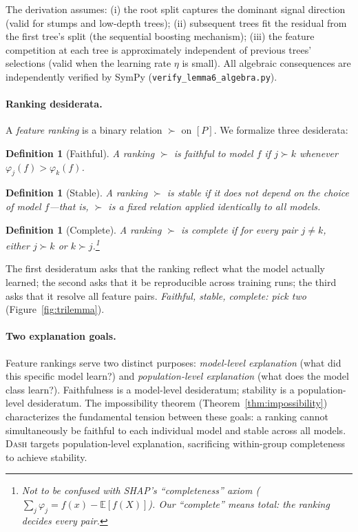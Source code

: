 \documentclass{article}
\newtheorem{definition}[theorem]{Definition}
\newcommand{\E}{\mathbb{E}}
\newcommand{\DASH}{\textsc{Dash}}
\begin{document}
The derivation assumes: (i) the root split captures the dominant signal direction (valid for stumps and low-depth trees); (ii) subsequent trees fit the residual from the first tree's split (the sequential boosting mechanism); (iii) the feature competition at each tree is approximately independent of previous trees' selections (valid when the learning rate $\eta$ is small). All algebraic consequences are independently verified by SymPy (\texttt{verify\_lemma6\_algebra.py}).

\paragraph{Ranking desiderata.}
A \emph{feature ranking} is a binary relation $\succ$ on $[P]$.
We formalize three desiderata:

\begin{definition}[Faithful]
\label{def:faithful}
A ranking $\succ$ is \emph{faithful} to model $f$ if $j \succ k$ whenever $\varphi_j(f) > \varphi_k(f)$.
\end{definition}

\begin{definition}[Stable]
\label{def:stable}
A ranking $\succ$ is \emph{stable} if it does not depend on the choice of model $f$---that is, $\succ$ is a fixed relation applied identically to all models.
\end{definition}

\begin{definition}[Complete]
\label{def:complete}
A ranking $\succ$ is \emph{complete} if for every pair $j \neq k$, either $j \succ k$ or $k \succ j$.\footnote{Not to be confused with SHAP's ``completeness'' axiom ($\sum_j \varphi_j = f(x) - \E[f(X)]$). Our ``complete'' means \emph{total}: the ranking decides every pair.}
\end{definition}

The first desideratum asks that the ranking reflect what the model actually learned; the second asks that it be reproducible across training runs; the third asks that it resolve all feature pairs.
\emph{Faithful, stable, complete: pick two} (Figure~\ref{fig:trilemma}).

\paragraph{Two explanation goals.}
Feature rankings serve two distinct purposes: \emph{model-level explanation} (what did this specific model learn?) and \emph{population-level explanation} (what does the model class learn?).
Faithfulness is a model-level desideratum; stability is a population-level desideratum.
The impossibility theorem (Theorem~\ref{thm:impossibility}) characterizes the fundamental tension between these goals: a ranking cannot simultaneously be faithful to each individual model and stable across all models.
\DASH{} targets population-level explanation, sacrificing within-group completeness to achieve stability.
\end{document}
